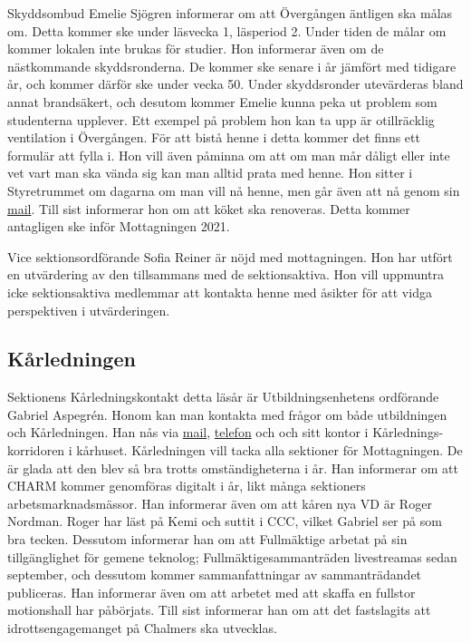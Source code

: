 \documentclass[hidelinks]{../sektionsmote} %
\begin{document}
Skyddsombud Emelie Sjögren informerar om att Övergången äntligen ska målas om.
Detta kommer ske under läsvecka 1, läsperiod 2.
Under tiden de målar om kommer lokalen inte brukas för studier.
Hon informerar även om de nästkommande skyddsronderna.
De kommer ske senare i år jämfört med tidigare år, och kommer därför ske under vecka 50. Under skyddsronder utevärderas bland annat brandsäkert, och desutom kommer Emelie kunna peka ut problem som studenterna upplever.
Ett exempel på problem hon kan ta upp är otillräcklig ventilation i Övergången.
För att bistå henne i detta kommer det finns ett formulär att fylla i.
Hon vill även påminna om att om man mår dåligt eller inte vet vart man ska vända sig kan man alltid prata med henne.
Hon sitter i Styretrummet om dagarna om man vill nå henne, men går även att nå genom sin \href{mailto:styret.samo@ftek.se}{mail}.
Till sist informerar hon om att köket ska renoveras.
Detta kommer antagligen ske inför Mottagningen 2021.

Vice sektionsordförande Sofia Reiner är nöjd med mottagningen.
Hon har utfört en utvärdering av den tillsammans med de sektionsaktiva.
Hon vill uppmuntra icke sektionsaktiva medlemmar att kontakta henne med åsikter för att vidga perspektiven i utvärderingen.

\subsection{Kårledningen}
Sektionens Kårledningskontakt detta läsår är Utbildningsenhetens ordförande Gabriel Aspegrén.
Honom kan man kontakta med frågor om både utbildningen och Kårledningen.
Han nås via \href{mailto:uo@chalmersstudentkar.se}{mail}, \href{tel:+46317723912}{telefon} och och sitt kontor i Kårlednings-korridoren i kårhuset.
Kårledningen vill tacka alla sektioner för Mottagningen.
De är glada att den blev så bra trotts omständigheterna i år.
Han informerar om att CHARM kommer genomföras digitalt i år, likt många sektioners arbetsmarknadsmässor.
Han informerar även om att kåren nya VD är Roger Nordman.
Roger har läst på Kemi och suttit i CCC, vilket Gabriel ser på som bra tecken.
Dessutom informerar han om att Fullmäktige arbetat på sin tillgänglighet för gemene teknolog; Fullmäktigesammanträden livestreamas sedan september, och dessutom kommer sammanfattningar av sammanträdandet publiceras.
Han informerar även om att arbetet med att skaffa en fullstor motionshall har påbörjats.
Till sist informerar han om att det fastslagits att idrottsengagemanget på Chalmers ska utvecklas.
\end{document}
